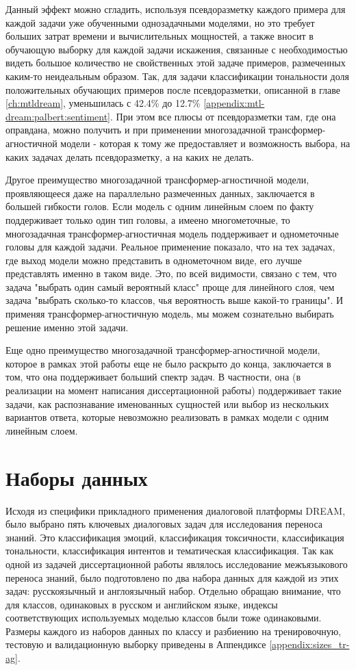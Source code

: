 Данный эффект можно сгладить, используя псевдоразметку каждого примера для каждой задачи уже обученными однозадачными моделями, но это требует больших затрат времени и вычислительных мощностей, а также вносит в обучающую выборку для каждой задачи искажения, связанные с необходимостью видеть большое количество не свойственных этой задаче примеров, размеченных каким-то неидеальным образом. Так, для задачи классификации тональности доля положительных обучающих примеров после псевдоразметки, описанной в главе \ref{ch:mtldream}, уменьшилась с 42.4\% до 12.7\% \ref{appendix:mtl-dream:palbert:sentiment}. При этом все плюсы от псевдоразметки там, где она оправдана, можно получить и при применении многозадачной трансформер-агностичной модели - которая к тому же предоставляет и возможность выбора, на каких задачах делать псевдоразметку, а на каких не делать.

Другое преимущество многозадачной трансформер-агностичной модели, проявляющееся даже на параллельно размеченных данных, заключается в большей гибкости голов. Если модель с одним линейным слоем по факту поддерживает только один тип головы, а имеено многометочные, то многозадачная трансформер-агностичная модель поддерживает и однометочные головы для каждой задачи. Реальное применение показало, что на тех задачах, где выход модели можно представить в однометочном виде, его лучше представлять именно  в таком виде. Это, по всей видимости, связано с тем, что задача "выбрать один самый вероятный класс" проще для линейного слоя, чем задача "выбрать сколько-то классов, чья вероятность выше какой-то границы". И применяя трансформер-агностичную модель, мы можем сознательно выбирать решение именно этой задачи.

Еще одно преимущество многозадачной трансформер-агностичной модели, которое в рамках этой работы еще не было раскрыто до конца, заключается в том, что она поддерживает больший спектр задач. В частности, она (в реализации на момент написания диссертационной работы) поддерживает такие задачи, как распознавание именованных сущностей или выбор из нескольких вариантов ответа, которые невозможно реализовать в рамках модели с одним линейным слоем. 


\section{Наборы данных}

Исходя из специфики прикладного применения диалоговой платформы DREAM, было выбрано пять ключевых диалоговых задач для исследования переноса знаний. Это классификация эмоций, классификация токсичности, классификация тональности, классификация интентов и тематическая классификация. Так как одной из задачей диссертационной работы являлось исследование межъязыкового переноса знаний, было подготовлено по два набора данных для каждой из этих задач: русскоязычный и англоязычный набор. Отдельно обращаю внимание, что для классов, одинаковых в русском и английском языке, индексы соответствующих используемых моделью классов были тоже одинаковыми. Размеры каждого из наборов данных по классу и разбиению на тренировочную, тестовую и валидационную выборку приведены в Аппендиксе \ref{appendix:sizes_tr-ag}.

